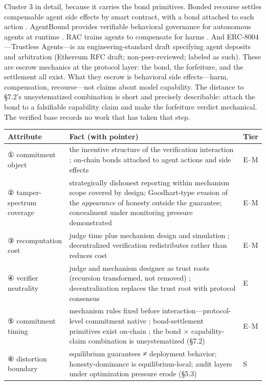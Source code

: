 \documentclass[11pt,a4paper]{article}
\begin{document}
Cluster 3 in detail, because it carries the bond primitives. Bonded recourse settles compensable agent side effects by smart contract, with a bond attached to each action \cite{key42}. AgentBound provides verifiable behavioral governance for autonomous agents at runtime \cite{key43}. RAC trains agents to compensate for harms \cite{key44}. And ERC-8004—Trustless Agents—is an engineering-standard draft specifying agent deposits and arbitration \cite{key45} (Ethereum RFC draft; non-peer-reviewed; labeled as such). These are escrow mechanics at the protocol layer: the bond, the forfeiture, and the settlement all exist. What they escrow is behavioral side effects—harm, compensation, recourse—not claims about model capability. The distance to §7.2's unsystematized combination is short and precisely describable: attach the bond to a falsifiable capability claim and make the forfeiture verdict mechanical. The verified base records no work that has taken that step.

\begin{table}[htbp]
\centering
\footnotesize
\setlength{\tabcolsep}{3.5pt}
\renewcommand{\arraystretch}{1.18}
\begin{tabularx}{0.985\textwidth}{>{\raggedright\arraybackslash}p{} >{\raggedright\arraybackslash}X >{\raggedright\arraybackslash}p{}}
\toprule
\textbf{Attribute} & \textbf{Fact (with pointer)} & \textbf{Tier} \\
\midrule
① commitment object & the incentive structure of the verification interaction \cite{key09,key10}; on-chain bonds attached to agent actions and side effects \cite{key42,key43,key44,key45} & E–M \\
② tamper-spectrum coverage & strategically dishonest reporting within mechanism scope covered by design; Goodhart-type evasion of the \textit{appearance} of honesty outside the guarantee; concealment under monitoring pressure demonstrated \cite{key27} & E–M \\
③ recomputation cost & judge time plus mechanism design and simulation \cite{key09}; decentralized verification redistributes rather than reduces cost \cite{key39,key40,key41} & E–M \\
④ verifier neutrality & judge and mechanism designer as trust roots (recursion transformed, not removed) \cite{key09,key10}; decentralization replaces the trust root with protocol consensus \cite{key39,key40,key41} & E \\
⑤ commitment timing & mechanism rules fixed before interaction—protocol-level commitment native \cite{key09,key10}; bond-settlement primitives exist on-chain \cite{key42,key43,key44,key45}; the bond × capability-claim combination is unsystematized (§7.2) & E–M \\
⑥ distortion boundary & equilibrium guarantees ≠ deployment behavior; honesty-dominance is equilibrium-local; audit layers under optimization pressure erode (§5.3) & S \\
\bottomrule
\end{tabularx}
\end{table}
\end{document}
